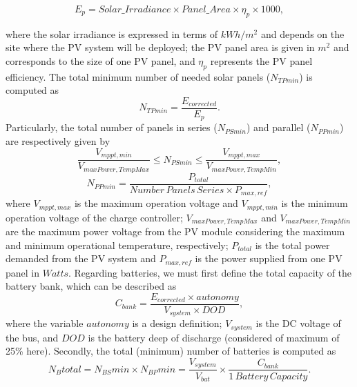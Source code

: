 \documentclass[runningheads]{llncs}
\begin{document}
\begin{equation}
\label{eq:Ep}
E_{p} = Solar\_Irradiance \times Panel\_Area \times \eta_{p} \times 1000,
\end{equation}

\noindent where the solar irradiance is expressed in terms of $kWh/m^{2}$ and depends on the site where the PV system will be deployed; 
the PV panel area is given in $m^{2}$ and corresponds to the size of one PV panel, and $\eta_{p}$ represents the PV panel efficiency.
%
The total minimum number of needed solar panels ($N_{TPmin}$) is computed as
%
\begin{equation}
\label{eq:NTPmin}
N_{TPmin} = \frac{E_{corrected}}{E_{p}}.
\end{equation}
%
Particularly, the total number of panels in series ($N_{PSmin}$) and parallel ($N_{PPmin}$) are respectively given by
%
\begin{equation}
\label{eq:NPSmin}
\frac{V_{mppt,min}}{V_{maxPower,TempMax}} \leq N_{PSmin} \leq \frac{V_{mppt,max}}{V_{maxPower,TempMin}},
\end{equation}
%
\begin{equation}
\label{eq:NPPmin}
N_{PPmin} = \frac{P_{total}}{Number\,Panels\,Series \times P_{max,ref}},
\end{equation}
%
\noindent where $V_{mppt,max}$ is the maximum operation voltage and $V_{mppt,min}$ is the minimum operation voltage of the charge controller; $V_{maxPower,TempMax}$ and $V_{maxPower,TempMin}$ are the maximum power voltage from the PV module considering the maximum and minimum operational temperature, respectively; $P_{total}$ is the total power demanded from the PV system and $P_{max,ref}$ is the power supplied from one PV panel in $Watts$.
%
Regarding batteries, we must first define the total capacity of the battery bank, which can be described as
\begin{equation}
\label{eq:Cbank}
\scriptstyle C_{bank} \scriptstyle = \frac{\scriptstyle E_{corrected} \scriptstyle \times \scriptstyle autonomy}{\scriptstyle V_{system} \scriptstyle \times \scriptstyle DOD},
\end{equation}
%
\noindent where the variable $autonomy$ is a design definition; %
$ V_{system} $ is the DC voltage of the bus, and $ DOD $ is the battery deep of discharge (considered of maximum of 25\% here).
%
Secondly, the total (minimum) number of batteries is computed as 
\begin{equation}
\label{eq:Nbtotal}
\scriptstyle N_{B}total = \scriptstyle N_{BS}min \scriptstyle \times \scriptstyle N_{BP}min = \frac{\scriptstyle V_{system}}{\scriptstyle V_{bat}} \scriptstyle \times \frac{\scriptstyle C_{bank}}{\scriptstyle 1 \,Battery \, Capacity}.
\end{equation}
\end{document}
